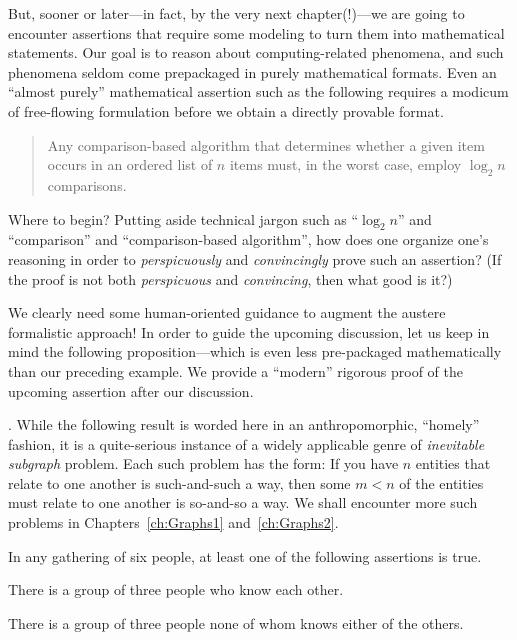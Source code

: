 But, sooner or later---in fact, by the very next chapter(!)---we are
going to encounter assertions that require some modeling to turn them
into mathematical statements.  Our goal is to reason about
computing-related phenomena, and such phenomena seldom come
prepackaged in purely mathematical formats.  Even an ``almost
purely'' mathematical assertion such as the following requires a
modicum of free-flowing formulation before we obtain a directly
provable format.
\begin{quote}
Any comparison-based algorithm that determines whether a given item
occurs in an ordered list of $n$ items must, in the worst case, employ
$\log_2 n$ comparisons.
\end{quote}
Where to begin? Putting aside technical jargon such as ``$\log_2 n$''
and ``comparison'' and ``comparison-based algorithm'', how does one
organize one's reasoning in order to {\em perspicuously} and {\em convincingly} prove such an
assertion?  (If the proof is not both  {\em perspicuous} and {\em convincing}, then what good is it?)

We clearly need some human-oriented guidance to augment the austere
formalistic approach!  In order to guide the upcoming discussion, let
us keep in mind the following proposition---which is even less
pre-packaged mathematically than our preceding example.  We provide a
``modern'' rigorous proof of the upcoming assertion after our
discussion.

\medskip

.
While the following result is worded here in an anthropomorphic,
``homely'' fashion, it is a quite-serious instance of a widely
applicable genre of {\it inevitable subgraph} problem.
 Each such problem has the form:
If you have $n$ entities that relate to one another is such-and-such a
way, then some $m < n$ of the entities must relate to one another is
so-and-so a way.  We shall encounter more such problems in
Chapters~\ref{ch:Graphs1} and~\ref{ch:Graphs2}.

\begin{prop}
\label{thm:triangle-cotriangles}
In any gathering of six people, at least one of the following
assertions is true.

There is a group of three people who know each other.

There is a group of three people none of whom knows either of the
others.
\end{prop}

